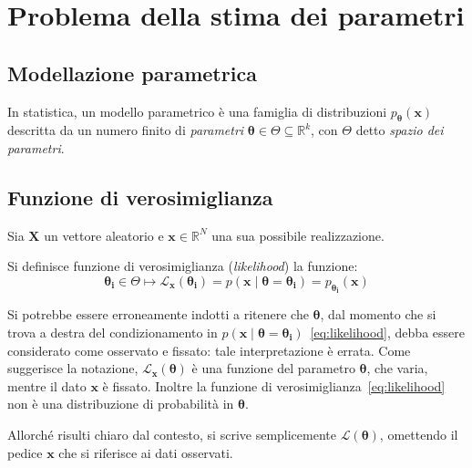\section{Problema della stima dei parametri}\label{sec:statistica}

\subsection{Modellazione parametrica}

In statistica, un modello parametrico è una famiglia di distribuzioni $p_{\bm{\theta}}(\mathbf{x})$ descritta 
da un numero finito di \emph{parametri} $\bm{\theta} \in \Theta \subseteq \mathbb{R}^k$, con $\Theta$ detto \emph{spazio dei parametri}.


\subsection{Funzione di verosimiglianza}\label{ssec:verosimiglianza}

Sia $\mathbf{X}$ un vettore aleatorio e $\mathbf{x} \in \mathbb{R}^N$ una sua possibile realizzazione.

\begin{Mybox}
    \begin{definizione}
        Si definisce funzione di verosimiglianza (\emph{likelihood}) la funzione:
        \begin{equation}
        \bm{\theta_i} \in \Theta \longmapsto \mathcal{L}_{\mathbf{x}}(\bm{\theta_i} )= p(\mathbf{x} \mid \bm{\theta}=\bm{\theta_i}) = p_{\bm{\theta_i}}(\mathbf{x})\label{eq:likelihood}
        \end{equation}   
    \end{definizione}
\end{Mybox}

\smallskip
\begin{oss}
Si potrebbe essere erroneamente indotti a ritenere che $\bm{\theta}$, dal momento che si trova a destra del 
condizionamento in $p(\mathbf{x} \mid \bm{\theta}=\bm{\theta_i})$~\eqref{eq:likelihood}, debba essere considerato 
come osservato e fissato: tale interpretazione è errata.
Come suggerisce la notazione, $\mathcal{L}_{\mathbf{x}}(\bm{\theta})$ è una funzione del parametro $\bm{\theta}$, che varia, mentre il dato 
$\mathbf{x}$ è fissato. Inoltre la funzione di verosimiglianza~\eqref{eq:likelihood} non è una distribuzione di probabilità in $\bm{\theta}$.
\end{oss}
\begin{oss}
Allorché risulti chiaro dal contesto, si scrive semplicemente $\mathcal{L}(\bm{\theta})$, 
omettendo il pedice $\mathbf{x}$ che si riferisce ai dati osservati. 
\end{oss}

